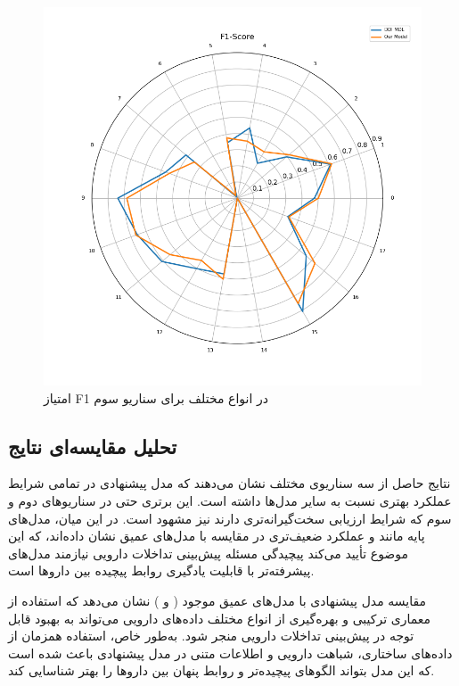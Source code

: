 \begin{figure}[t]
	\centering
	\includegraphics[width=\textwidth]{images/s4-f1-score.png}
	\caption{ امتیاز F1 در انواع مختلف برای سناریو سوم }
	\label{fig:s4_f1_score}
\end{figure}

\subsection{تحلیل مقایسه‌ای نتایج}

نتایج حاصل از سه سناریوی مختلف نشان می‌دهند که مدل پیشنهادی در تمامی شرایط عملکرد بهتری نسبت به سایر مدل‌ها داشته است. این برتری حتی در سناریوهای دوم و سوم که شرایط ارزیابی سخت‌گیرانه‌تری دارند نیز مشهود است. در این میان، مدل‌های پایه مانند  و  عملکرد ضعیف‌تری در مقایسه با مدل‌های عمیق نشان داده‌اند، که این موضوع تأیید می‌کند پیچیدگی مسئله پیش‌بینی تداخلات دارویی نیازمند مدل‌های پیشرفته‌تر با قابلیت یادگیری روابط پیچیده بین داروها است.

مقایسه مدل پیشنهادی با مدل‌های عمیق موجود ( و ) نشان می‌دهد که استفاده از معماری ترکیبی و بهره‌گیری از انواع مختلف داده‌های دارویی می‌تواند به بهبود قابل توجه در پیش‌بینی تداخلات دارویی منجر شود. به‌طور خاص، استفاده همزمان از داده‌های ساختاری، شباهت دارویی و اطلاعات متنی در مدل پیشنهادی باعث شده است که این مدل بتواند الگوهای پیچیده‌تر و روابط پنهان بین داروها را بهتر شناسایی کند.

